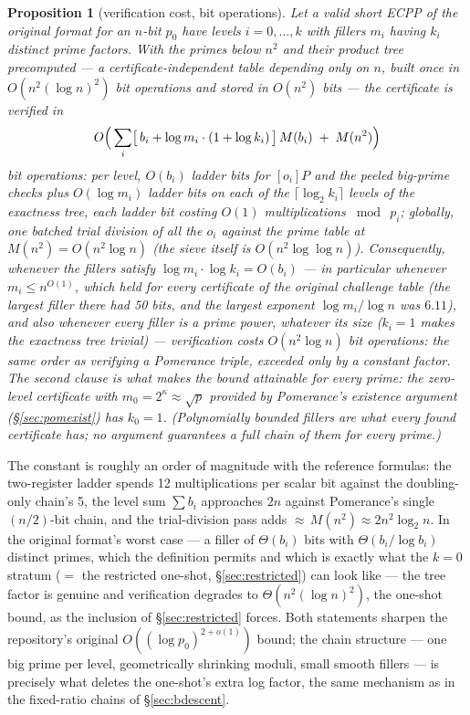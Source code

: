 \documentclass[11pt]{amsart}
\theoremstyle{plain}
\newtheorem{proposition}[theorem]{Proposition}
\theoremstyle{definition}
\theoremstyle{remark}
\begin{document}
\begin{proposition}[verification cost, bit operations]\label{prop:shortverif}
Let a valid short ECPP of the original format for an $n$-bit $p_0$ have levels $i = 0, \dots, k$ with fillers $m_i$ having
$k_i$ distinct prime factors.  With the primes below $n^2$ and their product tree precomputed --- a
certificate-independent table depending only on $n$, built once in $O(n^2(\log n)^2)$ bit operations
and stored in $O(n^2)$ bits --- the certificate is verified in
\[
  O\Bigl(\, \sum_i \bigl[\, b_i + \log m_i\cdot(1 + \log k_i)\,\bigr]\, M(b_i) \;+\; M(n^2) \Bigr)
\]
bit operations: per level, $O(b_i)$ ladder bits for $[o_i]P$ and the peeled big-prime checks plus
$O(\log m_i)$ ladder bits on each of the $\lceil\log_2 k_i\rceil$ levels of the exactness tree, each
ladder bit costing $O(1)$ multiplications $\bmod\ p_i$; globally, one batched trial division of all the
$o_i$ against the prime table at $M(n^2) = O(n^2\log n)$ \cite{Bern04} (the sieve itself is
$O(n^2\log\log n)$).  Consequently, whenever the fillers satisfy
$\log m_i\cdot\log k_i = O(b_i)$ --- in particular whenever $m_i \le n^{O(1)}$, which held for every
certificate of the original challenge table (the largest filler there had 50 bits, and the largest
exponent $\log m_i/\log n$ was $6.11$), and also whenever every filler is a
prime power, whatever its size ($k_i = 1$ makes the exactness tree trivial) --- \emph{verification
costs $O(n^2\log n)$ bit operations: the
same order as verifying a Pomerance triple, exceeded only by a constant factor}.  The second clause is
what makes the bound attainable for \emph{every} prime: the zero-level certificate with
$m_0 = 2^{\kappa} \approx \sqrt p$ provided by Pomerance's existence argument (\S\ref{sec:pomexist})
has $k_0 = 1$.  (Polynomially bounded fillers are what every \emph{found} certificate has; no argument
guarantees a full chain of them for every prime.)
\end{proposition}

The constant is roughly an order of magnitude with the reference formulas: the two-register ladder
spends 12 multiplications per scalar bit against the doubling-only chain's 5, the level sum
$\sum b_i$ approaches $2n$ against Pomerance's single $(n/2)$-bit chain, and the trial-division pass
adds ${\approx}\,M(n^2) \approx 2n^2\log_2 n$.  In the original format's worst case --- a filler of
$\Theta(b_i)$ bits with $\Theta(b_i/\log b_i)$ distinct primes, which the definition permits and which
is exactly what the $k = 0$ stratum ($=$ the restricted one-shot, \S\ref{sec:restricted}) can look like
--- the tree factor is genuine and verification degrades to $\Theta(n^2(\log n)^2)$, the one-shot
bound, as the inclusion of \S\ref{sec:restricted} forces.  Both statements sharpen the repository's original
$O((\log p_0)^{2+o(1)})$ bound; the chain structure --- one big prime per level, geometrically shrinking
moduli, small smooth fillers --- is precisely what deletes the one-shot's extra log factor, the same
mechanism as in the fixed-ratio chains of \S\ref{sec:bdescent}.
\end{document}
